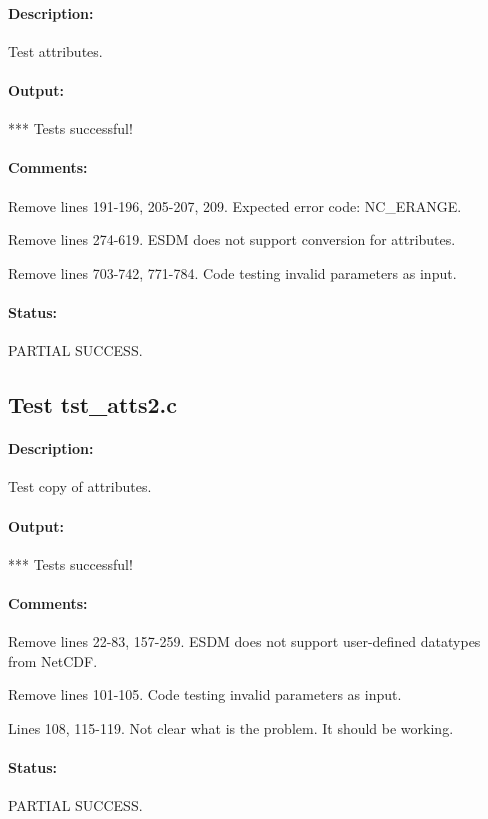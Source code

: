 \paragraph{Description:} Test attributes.

\paragraph{Output:} *** Tests successful!

\paragraph{Comments:} Remove lines 191-196, 205-207, 209. Expected error code: NC\_ERANGE.

Remove lines 274-619. ESDM does not support conversion for attributes.

Remove lines 703-742, 771-784. Code testing invalid parameters as input.

\paragraph{Status:} PARTIAL SUCCESS.

\subsection{Test tst\_atts2.c}

\paragraph{Description:} Test copy of attributes.

\paragraph{Output:} *** Tests successful!

\paragraph{Comments:} Remove lines 22-83, 157-259. ESDM does not support user-defined datatypes from NetCDF.

Remove lines 101-105. Code testing invalid parameters as input.

Lines 108, 115-119. Not clear what is the problem. It should be working.

\paragraph{Status:} PARTIAL SUCCESS.


